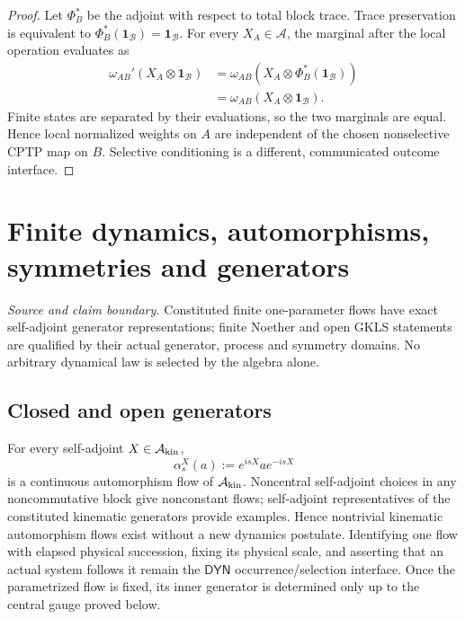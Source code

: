 \documentclass[12pt,a4paper]{article}
\begin{document}
\begin{proof}
Let \(\Phi_B^*\) be the adjoint with respect to total block trace.  Trace
preservation is equivalent to
\(\Phi_B^*(\mathbf1_{\mathcal B})=\mathbf1_{\mathcal B}\).  For every
\(X_A\in\mathcal A\), the marginal after the local operation evaluates as
\begin{align*}
\omega_{AB}'(X_A\otimes\mathbf1_{\mathcal B})
&=
\omega_{AB}\!\left(
X_A\otimes\Phi_B^*(\mathbf1_{\mathcal B})\right)\\
&=
\omega_{AB}(X_A\otimes\mathbf1_{\mathcal B}).
\end{align*}
Finite states are separated by their evaluations, so the two marginals are
equal.  Hence local normalized weights on \(A\) are independent of the chosen
nonselective CPTP map on \(B\).  Selective conditioning is a different,
communicated outcome interface.

\end{proof}



\section{Finite dynamics, automorphisms, symmetries and generators}
\label{p4a:sec:v238-a5}
\noindent\textit{Source and claim boundary.} Constituted finite one-parameter flows have exact self-adjoint generator representations; finite Noether and open GKLS statements are qualified by their actual generator, process and symmetry domains. No arbitrary dynamical law is selected by the algebra alone.

\subsection{Closed and open generators}
\label{p4:sec:part1-generators}

\begin{corollary}
\label{p4:cor:native-kinematic-flows}
For every self-adjoint \(X\in\mathcal A_{\rm kin}\),
\[
 \alpha_s^X(a):=e^{isX}ae^{-isX}
\]
is a continuous automorphism flow of \(\mathcal A_{\rm kin}\).  Noncentral
self-adjoint choices in any noncommutative block give nonconstant flows;
self-adjoint representatives of the constituted kinematic generators provide
examples.  Hence nontrivial kinematic automorphism flows exist without a new
dynamics postulate.  Identifying one flow with elapsed physical succession,
fixing its physical scale, and asserting that an actual system follows it
remain the \(\mathsf{DYN}\) occurrence/selection interface.  Once the
parametrized flow is fixed, its inner generator is determined only up to the
central gauge proved below.
\end{corollary}
\end{document}
